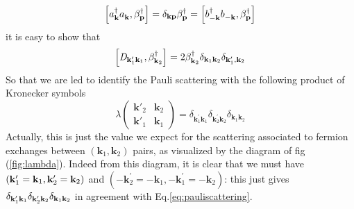 \documentclass[aps,prb,superscriptaddress,twocolumn]{revtex4}
\newcommand{\vk}{\ensuremath{\mathbf{k}}}
\begin{document}
\begin{equation}  \label{eq:aBeta}
\left[a^{\dagger}_{\mathbf{k} }a^{}_{\mathbf{k} },\beta^{\dagger}_{\mathbf{p}
}\right]  =\delta_{\mathbf{k} \mathbf{p} }\beta^{\dagger}_{\mathbf{p} }=%
\left[b^{\dagger}_{-\mathbf{k} }b^{}_{-\mathbf{k} },\beta^{\dagger}_{\mathbf{%
p} }\right]  
\end{equation}
it is easy to show that 
\begin{equation}  \label{eq:Dcom}
\left[\mathit{D} _{\mathbf{k} ^{\prime}_1\mathbf{k} _1},\beta^{\dagger}_{%
\mathbf{k} _2}\right]  =2\beta^{\dagger}_{\mathbf{k} _2}\delta_{\mathbf{k} _1%
\mathbf{k} _2}\delta_{\mathbf{k} ^{\prime}_1,\mathbf{k} _2}
\end{equation}
So that we are led to identify the Pauli scattering with the following
product of Kronecker symbols 
\begin{equation}  \label{eq:pauliscattering}
\lambda\left(\begin{smallmatrix}\vk'_2&\vk_2\\\vk'_1&\vk_1\end{smallmatrix}%
\right)  =\delta_{\mathbf{k} ^{\prime}_1\mathbf{k} _1}\delta_{\mathbf{k}
^{\prime}_2\mathbf{k} _2}\delta_{\mathbf{k} _1\mathbf{k} _2}
\end{equation}
Actually, this is just the value we expect for the scattering associated to
fermion exchanges between $\left(\mathbf{k} _1,\mathbf{k} _2\right) $ pairs,
as visualized by the diagram of fig (\ref{fig:lambda}). Indeed from this
diagram, it is clear that we must have $\left(\mathbf{k} ^{\prime}_1=\mathbf{%
k} _1,\mathbf{k} ^{\prime}_2=\mathbf{k} _2\right) $ and $\left(-\mathbf{k}
^{\prime}_2=-\mathbf{k} _1,-\mathbf{k} ^{\prime}_1=-\mathbf{k} _2\right) $:
this just gives $\delta_{\mathbf{k} ^{\prime}_1\mathbf{k} _1}\delta_{\mathbf{%
k} ^{\prime}_2\mathbf{k} _2}\delta_{\mathbf{k} _1\mathbf{k} _2}$ in
agreement with Eq.\eqref{eq:pauliscattering}.
\end{document}
